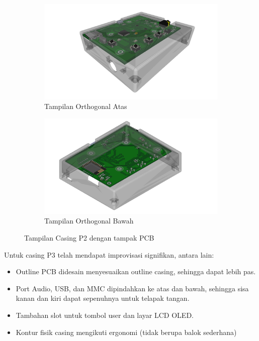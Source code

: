 \documentclass{book} %
\begin{document}
	\begin{figure}[!ht]
		\centering
		\begin{subfigure}[t]{0.45\textwidth}
			\includegraphics[width=\textwidth]{images/p2_ortho_top_trans}
			\caption{Tampilan Orthogonal Atas}
		\end{subfigure}
		\begin{subfigure}[t]{0.45\textwidth}
			\includegraphics[width=\textwidth]{images/p2_ortho_bot_trans}
			\caption{Tampilan Orthogonal Bawah}
		\end{subfigure}
		\caption{Tampilan Casing P2 dengan tampak PCB}
	\end{figure}

	Untuk casing P3 telah mendapat improvisasi signifikan, antara lain:
	\begin{itemize}
		\item Outline PCB didesain menyesuaikan outline casing, sehingga dapat lebih pas.
		
		\item Port Audio, USB, dan MMC dipindahkan ke atas dan bawah, sehingga sisa kanan dan kiri
		dapat sepenuhnya untuk telapak tangan.
		
		\item Tambahan slot untuk tombol user dan layar LCD OLED.
		
		\item Kontur fisik casing mengikuti ergonomi (tidak berupa balok sederhana)
	\end{itemize}
\end{document}
